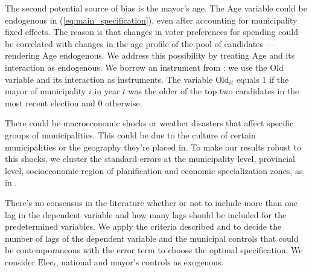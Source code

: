 The second potential source of bias is the mayor’s age. The Age variable could be endogenous in (\ref{eq:main_specification}), even after accounting for municipality fixed effects. The reason is that changes in voter preferences for spending could be correlated with changes in the age profile of the pool of candidates —rendering Age endogenous. We address this possibility by treating Age and its interaction as endogenous. We borrow an instrument from \textcite{alesina2018}: we use the Old variable and its interaction as instruments. The variable $\text{Old}_{it}$ equals 1 if the mayor of municipality $i$ in year $t$ was the older of the top two candidates in the most recent election and 0 otherwise. 

There could be macroeconomic shocks or weather disasters that affect specific groups of municipalities. This could be due to the culture of certain municipalities or the geography they're placed in. To make our results robust to this shocks, we cluster the standard errors at the municipality level, provincial level, socioeconomic region of planification and economic specialization zones, as in \textcite{alfaro2019}. 

There's no consensus in the literature whether or not to include more than one lag in the dependent variable and how many lags should be included for the predetermined variables. We apply the criteria described \textcite{kripfganz2019} and \textcite{kiviet2020} to decide the number of lags of the dependent variable and the municipal controls that could be contemporaneous with the error term to choose the optimal specification. We consider $\text{Elec}_t$, national and mayor's controls as exogenous. 

